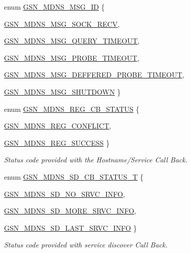 \begin{DoxyCompactItemize}
\item 
enum \hyperlink{a00526_aea0edb0e612a2715e8e8b67018db1936}{GSN\_\-MDNS\_\-MSG\_\-ID} \{ \par
\hyperlink{a00526_aea0edb0e612a2715e8e8b67018db1936a3bcfeda59574b0ba3fe7012e421e268c}{GSN\_\-MDNS\_\-MSG\_\-SOCK\_\-RECV}, 
\par
\hyperlink{a00526_aea0edb0e612a2715e8e8b67018db1936a4d7de153330f3247f4a3e6c47f47b892}{GSN\_\-MDNS\_\-MSG\_\-QUERY\_\-TIMEOUT}, 
\par
\hyperlink{a00526_aea0edb0e612a2715e8e8b67018db1936a1279aab6d13f741b567c33069a8d87c4}{GSN\_\-MDNS\_\-MSG\_\-PROBE\_\-TIMEOUT}, 
\par
\hyperlink{a00526_aea0edb0e612a2715e8e8b67018db1936ac9a72bc4da74198516947de43847084c}{GSN\_\-MDNS\_\-MSG\_\-DEFFERED\_\-PROBE\_\-TIMEOUT}, 
\par
\hyperlink{a00526_aea0edb0e612a2715e8e8b67018db1936ade57c2db6590877ad83cb3892016fde3}{GSN\_\-MDNS\_\-MSG\_\-SHUTDOWN}
 \}
\item 
enum \hyperlink{a00668_ga4736a957266d4e3ba37c9d5ec86beec8}{GSN\_\-MDNS\_\-REG\_\-CB\_\-STATUS} \{ \par
\hyperlink{a00668_gga4736a957266d4e3ba37c9d5ec86beec8ae3550fd7b1f603639481cabb668a64a7}{GSN\_\-MDNS\_\-REG\_\-CONFLICT}, 
\par
\hyperlink{a00668_gga4736a957266d4e3ba37c9d5ec86beec8a522d97bab05dc2d11054ab2e8403639b}{GSN\_\-MDNS\_\-REG\_\-SUCCESS}
 \}
\begin{DoxyCompactList}\small\item\em Status code provided with the Hostname/Service Call Back. \end{DoxyCompactList}\item 
enum \hyperlink{a00668_gaf68e291caa4e1bdf31169e000c41750b}{GSN\_\-MDNS\_\-SD\_\-CB\_\-STATUS\_\-T} \{ \par
\hyperlink{a00668_ggaf68e291caa4e1bdf31169e000c41750ba84a90f5cecb68159bb169fe99804e810}{GSN\_\-MDNS\_\-SD\_\-NO\_\-SRVC\_\-INFO}, 
\par
\hyperlink{a00668_ggaf68e291caa4e1bdf31169e000c41750bad2c9bab4f8fc05c87a9d9c289cacbf0e}{GSN\_\-MDNS\_\-SD\_\-MORE\_\-SRVC\_\-INFO}, 
\par
\hyperlink{a00668_ggaf68e291caa4e1bdf31169e000c41750ba46681d7db333ef079e1d35f82ef33d53}{GSN\_\-MDNS\_\-SD\_\-LAST\_\-SRVC\_\-INFO}
 \}
\begin{DoxyCompactList}\small\item\em Status code provided with service discover Call Back. \end{DoxyCompactList}\item 

\end{DoxyCompactItemize}

